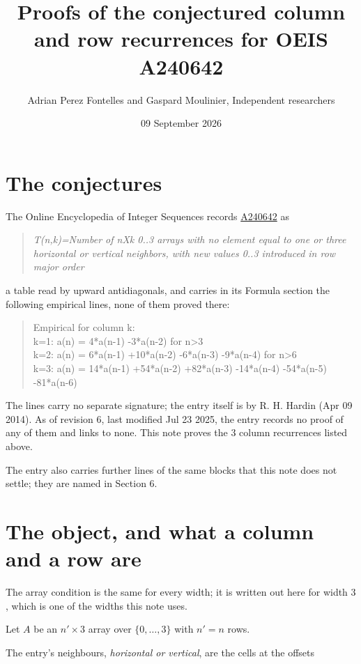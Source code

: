 \documentclass[11pt]{article}
\title{Proofs of the conjectured column and row recurrences for OEIS A240642}
\author{Adrian Perez Fontelles and Gaspard Moulinier, Independent researchers}
\date{09 September 2026}
\theoremstyle{definition}
\begin{document}
\maketitle
\section{The conjectures}

The Online Encyclopedia of Integer Sequences records \href{https://oeis.org/A240642}{A240642} as

\begin{quote}\itshape T(n,k)=Number of nXk 0..3 arrays with no element equal to one or three horizontal or vertical neighbors, with new values 0..3 introduced in row major order\end{quote}

a table read by upward antidiagonals, and carries in its Formula section the following empirical lines, none of them proved there:

\begin{quote}\ttfamily Empirical for column k:\\
k=1: a(n) = 4*a(n-1) -3*a(n-2) for n>3\\k=2: a(n) = 6*a(n-1) +10*a(n-2) -6*a(n-3) -9*a(n-4) for n>6\\k=3: a(n) = 14*a(n-1) +54*a(n-2) +82*a(n-3) -14*a(n-4) -54*a(n-5) -81*a(n-6)\end{quote}

The lines carry no separate signature; the entry itself is by R. H. Hardin (Apr 09 2014). As of revision 6, last modified Jul 23 2025, the entry records no proof of any of them and links to none. This note proves the 3 column recurrences listed above.

The entry also carries further lines of the same blocks that this note does not settle; they are named in Section 6.

\section{The object, and what a column and a row are}

The array condition is the same for every width; it is written out here for width $3$, which is one of the widths this note uses.

Let $A$ be an $n' \times 3$ array over $\{0,\dots,3\}$ with $n' = n$ rows.

The entry's neighbours, {\itshape horizontal or vertical}, are the cells at the offsets
\end{document}
